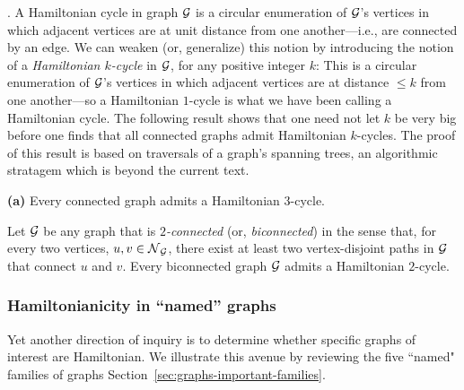 \medskip


.
A Hamiltonian cycle in graph $\mbox{$\cal G$}$ is a circular enumeration of $\mbox{$\cal G$}$'s vertices in which adjacent vertices are at unit distance from one another---i.e., are connected by an edge.  We can weaken (or, generalize) this notion by introducing the notion of a {\it Hamiltonian $k$-cycle} in $\mbox{$\cal G$}$, for any positive integer $k$:  This is a circular enumeration of $\mbox{$\cal G$}$'s vertices in which adjacent vertices are at distance $\leq k$ from one another---so a Hamiltonian $1$-cycle is what we have been calling a Hamiltonian cycle.  The following result shows that one need not let $k$ be very big before one finds that all connected graphs admit Hamiltonian $k$-cycles.  The proof of this result is based on traversals of a graph's spanning trees, an algorithmic stratagem which is beyond the current text.

\begin{prop}
\label{thm:weak-Hamiltonianicity}
{\bf (a)} {\rm \cite{ChartrandK69}}
Every connected graph admits a Hamiltonian $3$-cycle.

\smallskip

 

 {\rm  \cite{Fleischner74}}
Let $\mbox{$\cal G$}$ be any graph that is {\em $2$-connected} (or, {\it biconnected}) in the sense  that, for every two vertices, $u, v \in \mbox{$\cal N$}_{\mbox{{\scriptsize $\cal G$}}}$, there exist at least two vertex-disjoint paths in $\mbox{$\cal G$}$ that connect $u$ and $v$.  Every biconnected graph $\mbox{$\cal G$}$ admits a Hamiltonian $2$-cycle.
\end{prop}

\subsubsection{Hamiltonianicity in ``named'' graphs}
\label{sec:hamiltonian-named-graphs}

Yet another direction of inquiry is to determine whether specific graphs of interest are Hamiltonian.  We illustrate this avenue by reviewing the five ``named" families of graphs
Section~\ref{sec:graphs-important-families}.

